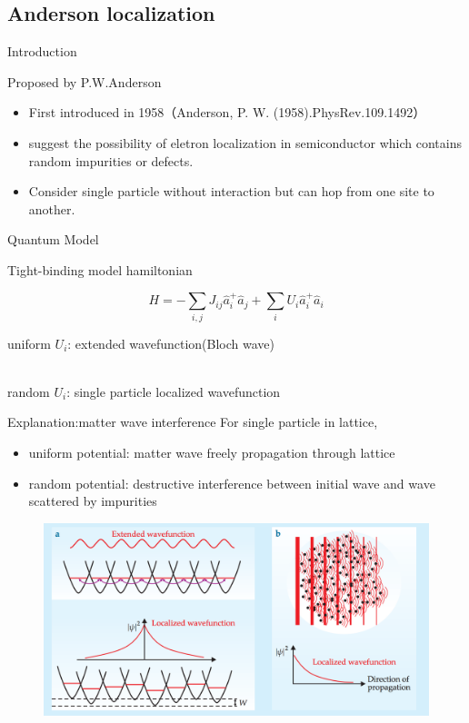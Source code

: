 \documentclass{beamer}
\begin{document}
\subsection{Anderson localization}
\begin{frame}{Introduction}

Proposed by P.W.Anderson

\begin{itemize}
\item First introduced in 1958（Anderson, P. W. (1958).PhysRev.109.1492）

\item suggest the possibility of eletron localization in semiconductor which contains random impurities or defects.

\item Consider single particle without interaction but can hop from one site to another.

\end{itemize}

\end{frame}

\begin{frame}{Quantum Model}

Tight-binding model hamiltonian

$$H = -\sum_{i,j}J_{ij} \hat{a}^{+}_{i}\hat{a}_{j}+\sum_{i}U_{i}\hat{a}^{+}_{i}\hat{a}_{i}$$

uniform $U_{i}$: extended wavefunction(Bloch wave)\\~


random  $U_{i}$: single particle localized wavefunction

\end{frame}
\begin{frame}{Explanation:matter wave interference}
For single particle in lattice,
\begin{itemize}
\item uniform potential: matter wave freely propagation through lattice
\item random potential: destructive interference between initial wave and wave scattered by impurities
\end{itemize}
\begin{figure}
\includegraphics[width=0.6\linewidth]{AndersonLocalization}
\end{figure}
\end{frame}
\end{document}
